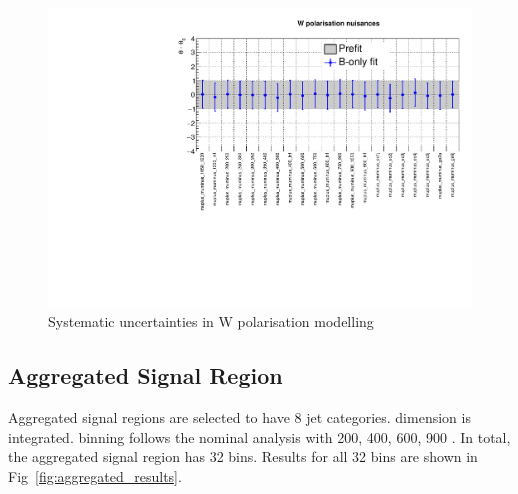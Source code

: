 \begin{figure}[h!]
  \centering
  \caption{Systematic uncertainties in W polarisation modelling}
  \includegraphics[width=0.8\linewidth]{figures/results/36invfb/postfit/nuis/WPol_nuisances}
\end{figure}

\clearpage
\subsection{Aggregated Signal Region}
\label{app:aggregated}
Aggregated signal regions are selected to have 8 jet categories. 
\scalht dimension is integrated. \HTmiss binning follows the nominal 
analysis with 200, 400, 600, 900 \gev. In total, the aggregated signal 
region has 32 bins. Results for all 32 bins are shown in Fig~\ref{fig:aggregated_results}.

